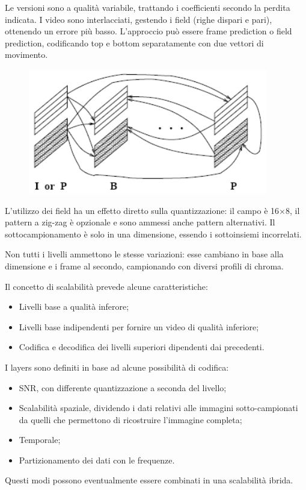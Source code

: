 Le versioni sono a qualità variabile, trattando i coefficienti secondo la perdita indicata. I video sono interlacciati, gestendo i field (righe dispari e pari), ottenendo un errore più basso. L'approccio può essere frame prediction o field prediction, codificando top e bottom separatamente con due vettori di movimento.

\begin{figure}[h]
	\centering
	\includegraphics[scale=0.7]{Lezioni/Immagini/ipbp}
\end{figure}

L'utilizzo dei field ha un effetto diretto sulla quantizzazione: il campo è 16$\times$8, il pattern a zig-zag è opzionale e sono ammessi anche pattern alternativi. Il sottocampionamento è solo in una dimensione, essendo i sottoinsiemi incorrelati. 

Non tutti i livelli ammettono le stesse variazioni: esse cambiano in base alla dimensione e i frame al secondo, campionando con diversi profili di chroma. 

Il concetto di scalabilità prevede alcune caratteristiche:
\begin{itemize}
	\item Livelli base a qualità inferore;
	\item Livelli base indipendenti per fornire un video di qualità inferiore;
	\item Codifica e decodifica dei livelli superiori dipendenti dai precedenti.
\end{itemize}

I layers sono definiti in base ad alcune possibilità di codifica:
\begin{itemize}
	\item SNR, con differente quantizzazione a seconda del livello;
	\item Scalabilità spaziale, dividendo i dati relativi alle immagini sotto-campionati da quelli che permettono di ricostruire l'immagine completa;
	\item Temporale;
	\item Partizionamento dei dati con le frequenze.
\end{itemize}
Questi modi possono eventualmente essere combinati in una scalabilità ibrida.

